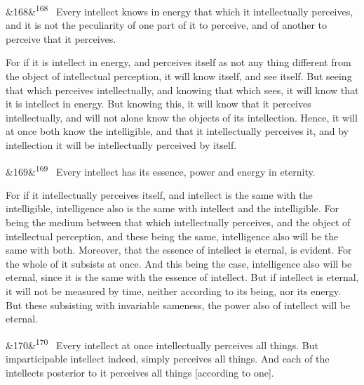 \documentclass[12pt]{article}
\newcommand{\para}[1][]{\par\noindent\ifx&#1&\else\textsuperscript{\footnotesize #1}~\fi}
\begin{document}
\para[168] Every intellect knows in energy that which it intellectually perceives, and it is not the peculiarity of one part of it to perceive, and of another to perceive that it perceives.

For if it is intellect in energy, and perceives itself as not any thing different from the object of intellectual perception, it will know itself, and see itself. But seeing that which perceives intellectually, and knowing that which sees, it will know that it is intellect in energy. But knowing this, it will know that it perceives intellectually, and will not alone know the objects of its intellection. Hence, it will at once both know the intelligible, and that it intellectually perceives it, and by intellection it will be intellectually perceived by itself.

\para[169] Every intellect has its essence, power and energy in eternity.

For if it intellectually perceives itself, and intellect is the same with the intelligible, intelligence also is the same with intellect and the intelligible. For being the medium between that which intellectually perceives, and the object of intellectual perception, and these being the same, intelligence also will be the same with both. Moreover, that the essence of intellect is eternal, is evident. For the whole of it subsists at once. And this being the case, intelligence also will be eternal, since it is the same with the essence of intellect. But if intellect is eternal, it will not be measured by time, neither according to its being, nor its energy. But these subsisting with invariable sameness, the power also of intellect will be eternal.

\para[170] Every intellect at once intellectually perceives all things. But imparticipable intellect indeed, simply perceives all things. And each of the intellects posterior to it perceives all things [according to one].
\end{document}

